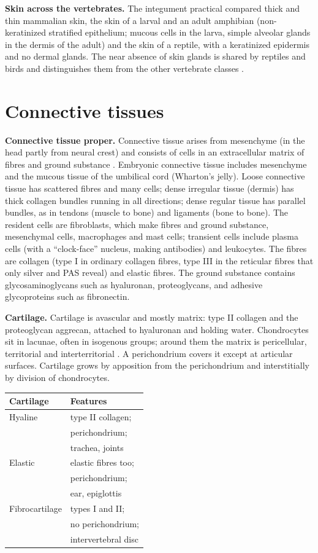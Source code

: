 \textbf{Skin across the vertebrates.} The
integument practical compared thick and thin
mammalian skin, the skin of a larval and an
adult amphibian (non-keratinized stratified
epithelium; mucous cells in the larva, simple
alveolar glands in the dermis of the adult)
and the skin of a reptile, with a keratinized
epidermis and no dermal glands. The near
absence of skin glands is shared by reptiles
and birds and distinguishes them from the
other vertebrate classes \cite[Chapter
4]{andrew1959comparative}.

\section{Connective tissues}
\label{section-connective}

\textbf{Connective tissue proper.} Connective
tissue arises from mesenchyme (in the head
partly from neural crest) and consists of
cells in an extracellular matrix of fibres
and ground substance \cite[Chapter
6]{ross2011histology}. Embryonic connective
tissue includes mesenchyme and the mucous
tissue of the umbilical cord (Wharton's
jelly). Loose connective tissue has scattered
fibres and many cells; dense irregular tissue
(dermis) has thick collagen bundles running
in all directions; dense regular tissue has
parallel bundles, as in tendons (muscle to
bone) and ligaments (bone to bone). The
resident cells are fibroblasts, which make
fibres and ground substance, mesenchymal
cells, macrophages and mast cells; transient
cells include plasma cells (with a
``clock-face'' nucleus, making antibodies)
and leukocytes. The fibres are collagen (type
I in ordinary collagen fibres, type III in
the reticular fibres that only silver and PAS
reveal) and elastic fibres. The ground
substance contains glycosaminoglycans such as
hyaluronan, proteoglycans, and adhesive
glycoproteins such as fibronectin.

\textbf{Cartilage.} Cartilage is avascular
and mostly matrix: type II collagen and the
proteoglycan aggrecan, attached to hyaluronan
and holding water. Chondrocytes sit in
lacunae, often in isogenous groups; around
them the matrix is pericellular, territorial
and interterritorial \cite[Chapter
7]{ross2011histology}. A perichondrium covers
it except at articular surfaces. Cartilage
grows by apposition from the perichondrium
and interstitially by division of
chondrocytes.

\begin{center}
\begin{tabular}{ll}
Cartilage & Features \\
\hline
Hyaline & type II collagen; \\
& perichondrium; \\
& trachea, joints \\
Elastic & elastic fibres too; \\
& perichondrium; \\
& ear, epiglottis \\
Fibrocartilage & types I and II; \\
& no perichondrium; \\
& intervertebral disc \\
\end{tabular}
\end{center}

